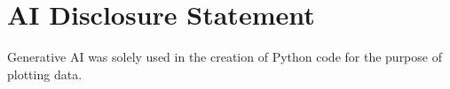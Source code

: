 \section{AI Disclosure Statement}

Generative AI was solely used in the creation of Python code for the purpose of
plotting data.
